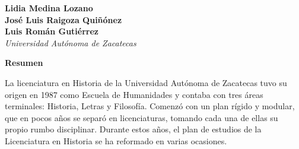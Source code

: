%
\thispagestyle{empty}
{\par}
\setcounter{footnote}{0}

\bigskip
\begin{center}
{\bfseries Lidia Medina Lozano\\
José Luis Raigoza Quiñónez\\
Luis Román Gutiérrez}\\
{\itshape Universidad Autónoma de Zacatecas}
\end{center}

\bigskip
\textbf{Resumen}
\enlargethispage{1\baselineskip}

La licenciatura en Historia de la Universidad Autónoma de Zacatecas 
tuvo su origen en 1987 como Escuela de Humanidades y contaba con tres áreas 
terminales: Historia, Letras y Filosofía. Comenzó con un plan rígido y 
modular, que en pocos años se separó en licenciaturas, tomando cada una 
de ellas su propio rumbo disciplinar. Durante estos años, el plan de estudios 
de la Licenciatura en Historia se ha reformado en varias ocasiones.


